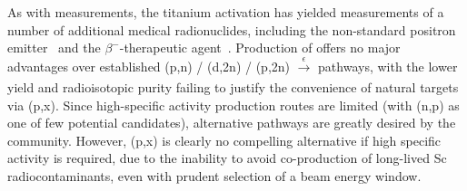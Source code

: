 As with  measurements, the titanium activation has  yielded measurements of  a number of additional  medical  radionuclides,  including the non-standard positron emitter
\,\cite{Muller2013,Filosofov2010,Qaim2011}
and the $\beta^-$-therapeutic agent 
\,\cite{Muller2014,Deilami-nezhad2016}.
Production of  offers no major advantages over established (p,n) / (d,2n) / (p,2n) $\xrightarrow[]{\epsilon}$  pathways, with the  lower yield and radioisotopic purity failing to justify the convenience of natural targets  via    (p,x). 
Since high-specific activity  production routes are limited (with  (n,p) as one of few potential candidates), alternative pathways are greatly desired by the community.
However, (p,x) is clearly no compelling alternative if high specific activity is required, due to the inability to avoid co-production of long-lived Sc radiocontaminants, even with prudent selection of a beam energy window.










